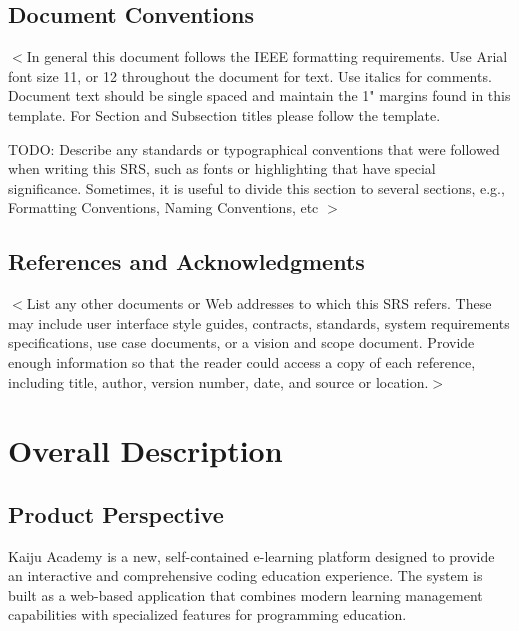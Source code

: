 \documentclass[a4paper, 11pt]{scrreprt}
\begin{document}
\section{Document Conventions}
$<$In general this document follows the IEEE formatting requirements. Use Arial font size 11, or 12 throughout the document for text. Use italics for comments. Document text should be single spaced and maintain the 1" margins found in this template. For Section and Subsection titles please follow the template. 

TODO: Describe any standards or typographical conventions that were followed when writing this SRS, such as fonts or highlighting that have special significance. Sometimes, it is useful to divide this section to several sections, e.g., Formatting Conventions, Naming Conventions, etc
$>$

\section{References and Acknowledgments}
$<$List any other documents or Web addresses to which this SRS refers. These may 
include user interface style guides, contracts, standards, system requirements 
specifications, use case documents, or a vision and scope document. Provide 
enough information so that the reader could access a copy of each reference, 
including title, author, version number, date, and source or location.$>$


\chapter{Overall Description}
\section{Product Perspective}

Kaiju Academy is a new, self-contained e-learning platform designed to provide an interactive and comprehensive coding education experience. The system is built as a web-based application that combines modern learning management capabilities with specialized features for programming education.
\end{document}
